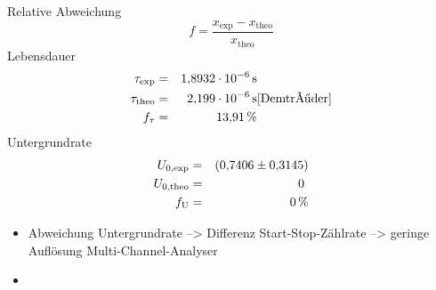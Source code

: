 Relative Abweichung
\begin{equation*}
  f=\frac{x_{\text{exp}}-x_{\text{theo}}}{x_{\text{theo}}}
\end{equation*}
Lebensdauer
\begin{align*}
  \tau_{\text{exp}}   &=&   \SI{1.8932e-06}{s}  &\\
  \tau_{\text{theo}}  &=&   \SI{2.199e-06}{s}   &\text{\cite{Demtröder}}\\
  f_{\tau}            &=&   \SI{13.91}{\%}      &\\
\end{align*}
Untergrundrate
\begin{align*}
  U_{\text{0,exp}}    &=&  \SI{0.7406 \pm 0.3145}{} &\\
  U_{\text{0,theo}}   &=&  \SI{0}{}   &\\
  f_{\text{U}}        &=&  \SI{0}{\%} &\\
\end{align*}
\begin{itemize}
  \item Abweichung Untergrundrate --> Differenz Start-Stop-Zählrate --> geringe Auflösung Multi-Channel-Analyser
  \item
\end{itemize}
